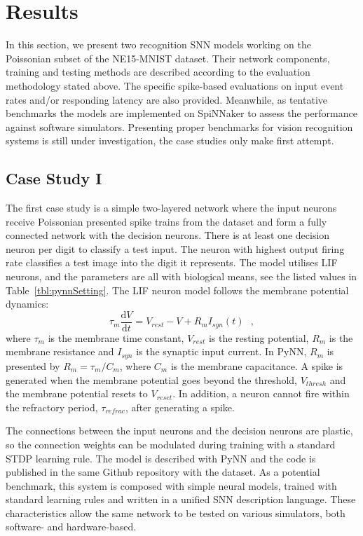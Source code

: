\documentclass{frontiersENG} %
\def\D{\mathrm{d}}
\begin{document}
\section{Results}
\label{sec:test}
In this section, we present two recognition SNN models working on the Poissonian subset of the NE15-MNIST dataset.
Their network components, training and testing methods are described according to the evaluation methodology stated above.
The specific spike-based evaluations on input event rates and/or responding latency are also provided. 
Meanwhile, as tentative benchmarks the models are implemented on SpiNNaker to assess the performance against software simulators.
Presenting proper benchmarks for vision recognition systems is still under investigation, the case studies only make first attempt.

\subsection{Case Study I}
The first case study is a simple two-layered network where the input neurons receive Poissonian presented spike trains from the dataset and form a fully connected network with the decision neurons.
There is at least one decision neuron per digit to classify a test input.
The neuron with highest output firing rate classifies a test image into the digit it represents.
The model utilises LIF neurons, and the parameters are all with biological means, see the listed values in Table~\ref{tbl:pynnSetting}.
The LIF neuron model follows the membrane potential
dynamics:
\begin{equation}
\tau_m \frac{\D V}{\D t}=V_{rest} - V + R_{m} I_{syn}(t) ~~~,
\label{eq:LIF}
\end{equation}
where $\tau_m$ is the membrane time constant, $ V_{rest} $ is the resting potential, $ R_{m} $ is the membrane resistance and $ I_{syn} $ is the synaptic input current.
In PyNN, $ R_{m} $ is presented by $ R_{m}=\tau_m/C_{m} $, where $C_{m} $ is the membrane capacitance.
A spike is generated when the membrane potential goes beyond the threshold, $ V_{thresh} $ and the membrane potential resets to $V_{reset}$.
In addition, a neuron cannot fire within the refractory period, $ \tau_{refrac} $, after generating a spike.

The connections between the input neurons and the decision neurons are plastic, so the connection weights can be modulated during training with a standard STDP learning rule.
The model is described with PyNN and the code is published in
the same Github repository with the dataset.
As a potential benchmark, this system is composed with simple neural models, trained with standard learning rules and written in a unified SNN description language. These characteristics allow the same network to be tested on various simulators, both software- and hardware-based.
\end{document}
